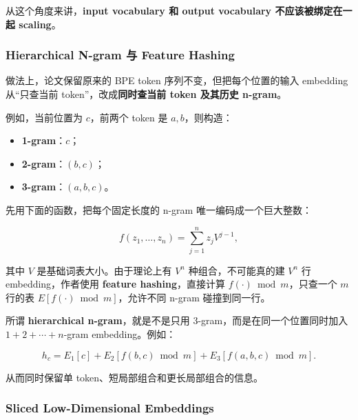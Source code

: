 \documentclass[
  11pt,
  a4paper,
  fontset=none]{ctexart}
\providecommand{\tightlist}{%
  \setlength{\itemsep}{0pt}\setlength{\parskip}{0pt}}
\newenvironment{NotesFormula}{%
  \par\noindent\begin{minipage}{\linewidth}%
  \setlength{\parindent}{2em}%
  \setlength{\parskip}{0.35em}%
}{\end{minipage}\par}
\begin{document}
从这个角度来讲，\textbf{input vocabulary 和 output vocabulary
不应该被绑定在一起 scaling}。

\subsubsection{Hierarchical N-gram 与 Feature
Hashing}\label{hierarchical-n-gram-ux4e0e-feature-hashing}

做法上，论文保留原来的 BPE token 序列不变，但把每个位置的输入 embedding
从``只查当前 token''，改成\textbf{同时查当前 token 及其历史 n-gram}。

例如，当前位置为 \(c\)，前两个 token 是 \(a,b\)，则构造：

\begin{itemize}
\tightlist
\item
  \textbf{1-gram}：\(c\)；
\item
  \textbf{2-gram}：\((b,c)\)；
\item
  \textbf{3-gram}：\((a,b,c)\)。
\end{itemize}

\begin{NotesFormula}

先用下面的函数，把每个固定长度的 n-gram 唯一编码成一个巨大整数：

\[
f(z_1,\ldots,z_n)=\sum_{j=1}^{n}z_j V^{j-1},
\]

\end{NotesFormula}

其中 \(V\) 是基础词表大小。由于理论上有 \(V^n\) 种组合，不可能真的建
\(V^n\) 行 embedding，作者使用 \textbf{feature hashing}，直接计算
\(f(\cdot)\bmod m\)，只查一个 \(m\) 行的表
\(E[f(\cdot)\bmod m]\)，允许不同 n-gram 碰撞到同一行。

\begin{NotesFormula}

所谓 \textbf{hierarchical n-gram}，就是不是只用
3-gram，而是在同一个位置同时加入 \(1+2+\cdots+n\)-gram embedding。例如：

\[
h_c=E_1[c]+E_2\!\left[f(b,c)\bmod m\right]
+E_3\!\left[f(a,b,c)\bmod m\right].
\]

\end{NotesFormula}

从而同时保留单 token、短局部组合和更长局部组合的信息。

\subsubsection{Sliced Low-Dimensional
Embeddings}\label{sliced-low-dimensional-embeddings}
\end{document}
